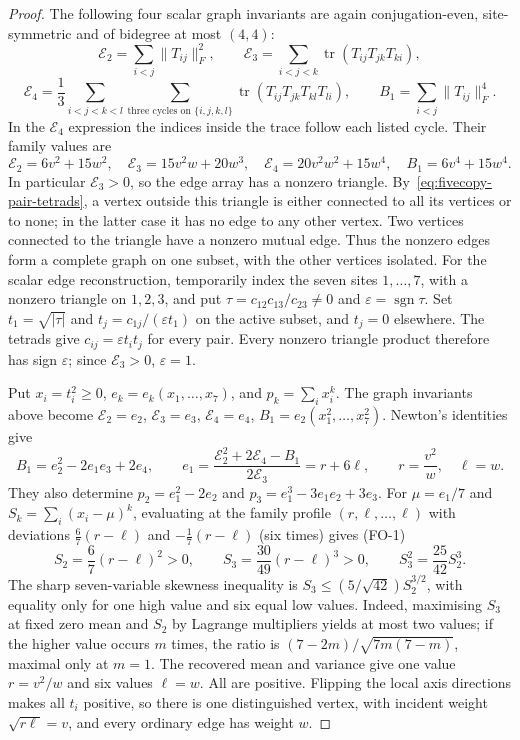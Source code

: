 \begin{proof}
The following four scalar graph invariants are again conjugation-even,
site-symmetric and of bidegree at most $(4,4)$:
\[
 \mathcal E_2=\sum_{i<j}\|T_{ij}\|_F^2,\qquad
 \mathcal E_3=\sum_{i<j<k}\operatorname{tr}(T_{ij}T_{jk}T_{ki}),
\]
\[
 \mathcal E_4=\frac13\sum_{i<j<k<l}
     \sum_{\text{three cycles on }\{i,j,k,l\}}
       \operatorname{tr}(T_{ij}T_{jk}T_{kl}T_{li}),
 \qquad B_1=\sum_{i<j}\|T_{ij}\|_F^4.
\]
In the $\mathcal E_4$ expression the indices inside the trace follow each listed cycle.
Their family values are
\[
 \mathcal E_2=6v^2+15w^2,\quad \mathcal E_3=15v^2w+20w^3,\quad
 \mathcal E_4=20v^2w^2+15w^4,\quad B_1=6v^4+15w^4.
\]
In particular $\mathcal E_3>0$, so the edge array has a nonzero triangle.
By~\eqref{eq:fivecopy-pair-tetrads}, a vertex outside this triangle
is either connected to all its vertices or to none; in the latter
case it has no edge to any other vertex.  Two vertices connected to
the triangle have a nonzero mutual edge.  Thus the nonzero edges form
a complete graph on one subset, with the other vertices isolated.
For the scalar edge reconstruction, temporarily index the seven sites $1,\dots,7$, with a nonzero triangle on $1,2,3$, and put
$\tau=c_{12}c_{13}/c_{23}\ne0$ and
$\varepsilon=\operatorname{sgn}\tau$.
Set $t_1=\sqrt{|\tau|}$ and
$t_j=c_{1j}/(\varepsilon t_1)$ on the active subset, and $t_j=0$
elsewhere.  The tetrads give $c_{ij}=\varepsilon t_it_j$ for every pair.
Every nonzero triangle product therefore has sign $\varepsilon$;
since $\mathcal E_3>0$, $\varepsilon=1$.

Put $x_i=t_i^2\ge0$, $e_k=e_k(x_1,\ldots,x_7)$, and
$p_k=\sum_i x_i^k$.  The graph invariants above become
$\mathcal E_2=e_2$, $\mathcal E_3=e_3$, $\mathcal E_4=e_4$, $B_1=e_2(x_1^2,\ldots,x_7^2)$.
Newton's identities give
\[
 B_1=e_2^2-2e_1e_3+2e_4,\qquad
 e_1=\frac{\mathcal E_2^2+2\mathcal E_4-B_1}{2\mathcal E_3}=r+6\ell,
 \qquad r=\frac{v^2}{w},\quad\ell=w.
\]
They also determine $p_2=e_1^2-2e_2$ and $p_3=e_1^3-3e_1e_2+3e_3$.
For $\mu=e_1/7$ and $S_k=\sum_i(x_i-\mu)^k$, evaluating at the family profile $(r,\ell,\dots,\ell)$ with deviations $\frac67(r-\ell)$ and $-\frac17(r-\ell)$ (six times) gives (FO-1)
\[
 S_2=\frac67(r-\ell)^2>0,\qquad
 S_3=\frac{30}{49}(r-\ell)^3>0,\qquad
 S_3^2=\frac{25}{42}S_2^3.
\]
The sharp seven-variable skewness inequality is
$S_3\le(5/\sqrt{42})S_2^{3/2}$, with equality only for one
high value and six equal low values.  Indeed, maximising $S_3$ at
fixed zero mean and $S_2$ by Lagrange multipliers yields at most two
values; if the higher value occurs $m$ times, the ratio is
$(7-2m)/\sqrt{7m(7-m)}$, maximal only at $m=1$.
The recovered mean and variance give one value $r=v^2/w$ and six values
$\ell=w$. All are positive. Flipping the local axis directions makes all
$t_i$ positive, so there is one distinguished vertex, with incident weight
$\sqrt{r\ell}=v$, and every ordinary edge has weight $w$.


\end{proof}
